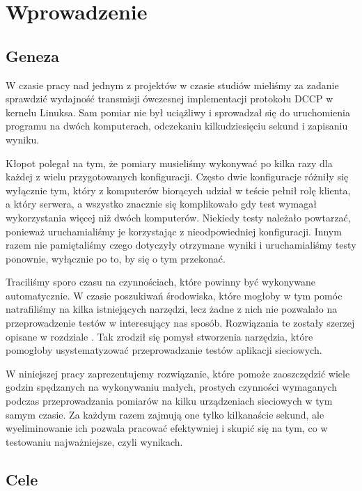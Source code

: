 \documentclass[00-praca-magisterska.tex]{subfiles}
\begin{document}
\chapter{Wprowadzenie}

\section{Geneza}

W czasie pracy nad jednym z projektów w czasie studiów mieliśmy za zadanie
sprawdzić wydajność transmisji ówczesnej implementacji protokołu DCCP w kernelu
Linuksa.  Sam pomiar nie był uciążliwy i sprowadzał się do uruchomienia
programu na dwóch komputerach, odczekaniu kilkudziesięciu sekund i zapisaniu
wyniku.

Kłopot polegał na tym, że pomiary musieliśmy wykonywać po kilka razy dla
każdej z wielu przygotowanych konfiguracji. Często dwie konfiguracje różniły się
wyłącznie tym, który z komputerów biorących udział w teście pełnił rolę klienta,
a który serwera, a wszystko znacznie się komplikowało gdy test wymagał
wykorzystania więcej niż dwóch komputerów. Niekiedy testy należało powtarzać,
ponieważ uruchamialiśmy je korzystając z nieodpowiedniej konfiguracji. Innym
razem nie pamiętaliśmy czego dotyczyły otrzymane wyniki i uruchamialiśmy testy
ponownie, wyłącznie po to, by się o tym przekonać.

Traciliśmy sporo czasu na czynnościach, które powinny być wykonywane
automatycznie. W czasie poszukiwań środowiska, które mogłoby w tym pomóc
natrafiliśmy na kilka istniejących narzędzi, lecz żadne z nich nie pozwalało
na przeprowadzenie testów w interesujący nas sposób. Rozwiązania te zostały
szerzej opisane w rozdziale . Tak
zrodził się pomysł stworzenia narzędzia, które pomogłoby usystematyzować
przeprowadzanie testów aplikacji sieciowych.

W niniejszej pracy zaprezentujemy rozwiązanie, które pomoże zaoszczędzić wiele
godzin spędzanych na wykonywaniu małych, prostych czynności wymaganych podczas
przeprowadzania pomiarów na kilku urządzeniach sieciowych w tym samym czasie.
Za każdym razem zajmują one tylko kilkanaście sekund, ale wyeliminowanie ich
pozwala pracować efektywniej i skupić się na tym, co w testowaniu
najważniejsze, czyli wynikach.

\section{Cele}
\end{document}
